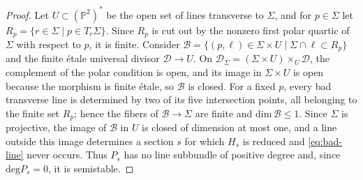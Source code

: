 \documentclass[10pt,a4paper]{amsart}
\begin{document}
\begin{proof}
Let $U\subset(\mathbb{P}^2)^*$ be the open set of lines transverse to
$\Sigma$, and for $p\in\Sigma$ let
$R_p=\{r\in\Sigma \mid p\in T_r\Sigma\}$.  Since $R_p$ is cut out by the nonzero
first polar quartic of $\Sigma$ with respect to $p$, it is finite.  Consider
$\mathcal{B}=\{(p,\ell)\in\Sigma\times U \mid \Sigma\cap\ell\subset R_p\}$ and
the finite \'etale universal divisor $\mathcal{D}\to U$.  On
$\mathcal{D}_\Sigma=(\Sigma\times U)\times_U\mathcal{D}$, the complement of
the polar condition is open, and its image in $\Sigma\times U$ is open
because the morphism is finite \'etale, so $\mathcal{B}$ is closed.  For a
fixed $p$, every bad transverse line is determined by two of its five
intersection points, all belonging to the finite set $R_p$; hence the
fibers of $\mathcal{B}\to\Sigma$ are finite and
$\mathrm{dim}\,\mathcal{B}\leq1$.  Since $\Sigma$ is projective, the image
of $\mathcal{B}$ in $U$ is closed of dimension at most one, and a line
outside this image determines a section $s$ for which $H_s$ is reduced and
\eqref{eq:bad-line} never occurs.  Thus $P_s$ has no line
subbundle of positive degree and, since $\mathrm{deg}P_s=0$, it is semistable.
\end{proof}
\end{document}
